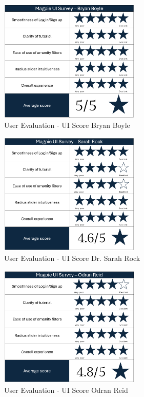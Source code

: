 \begin{figure}[htbp]
    \centering
    \includegraphics[width=0.6\textwidth]{images/survey-bryan.png}
    \caption{User Evaluation - UI Score Bryan Boyle}
    \label{fig:bryanscore}
\end{figure}

\begin{figure}[htbp]
    \centering
    \includegraphics[width=0.6\textwidth]{images/survey-sarah.png}
    \caption{User Evaluation - UI Score Dr. Sarah Rock}
    \label{fig:sarahscore}
\end{figure}

\begin{figure}[htbp]
    \centering
    \includegraphics[width=0.6\textwidth]{images/survey-odran.png}
    \caption{User Evaluation - UI Score Odran Reid}
    \label{fig:odranscore}
\end{figure}

